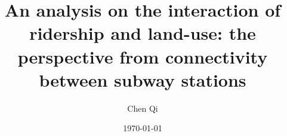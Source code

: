 \documentclass[utf8]{article}
\begin{document}
\title{An analysis on the interaction of ridership and land-use: the perspective from connectivity between subway stations}
\author{Chen Qi}
\date{\today}
\maketitle
\end{document}
